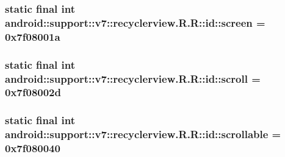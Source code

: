\hypertarget{classandroid_1_1support_1_1v7_1_1recyclerview_1_1_r_1_1id_cc20af10128a1dfae9341d01ef64d6a3}{
\subsubsection[{screen}]{\setlength{\rightskip}{0pt plus 5cm}static final int android::support::v7::recyclerview.R.R::id::screen = 0x7f08001a}}
\label{classandroid_1_1support_1_1v7_1_1recyclerview_1_1_r_1_1id_cc20af10128a1dfae9341d01ef64d6a3}


\hypertarget{classandroid_1_1support_1_1v7_1_1recyclerview_1_1_r_1_1id_85b52f28e0d189209ef01594ee2a3b67}{
\subsubsection[{scroll}]{\setlength{\rightskip}{0pt plus 5cm}static final int android::support::v7::recyclerview.R.R::id::scroll = 0x7f08002d}}
\label{classandroid_1_1support_1_1v7_1_1recyclerview_1_1_r_1_1id_85b52f28e0d189209ef01594ee2a3b67}


\hypertarget{classandroid_1_1support_1_1v7_1_1recyclerview_1_1_r_1_1id_d17fa2a4e54c0476c5fdaada2b8d8519}{
\subsubsection[{scrollable}]{\setlength{\rightskip}{0pt plus 5cm}static final int android::support::v7::recyclerview.R.R::id::scrollable = 0x7f080040}}
\label{classandroid_1_1support_1_1v7_1_1recyclerview_1_1_r_1_1id_d17fa2a4e54c0476c5fdaada2b8d8519}


